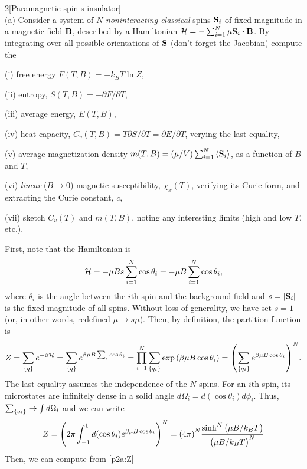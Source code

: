\documentclass[12pt]{article}
\begin{document}
\begin{problem}{2}[Paramagnetic spin-s insulator]~\\

(a) Consider a system of $N$ \textit{noninteracting classical} spins $\vb{S}_i$
of fixed magnitude in a magnetic field $\vb{B}$, described by a Hamiltonian
$\HH=-\sum_{i=1}^N\mu\vb{S}_i\vdot\vb{B}$. By integrating over all possible
orientations of $\vb{S}$ (don't forget the Jacobian) compute the

\qquad(i) free energy $F(T,B)=-k_BT\ln Z$,

\qquad(ii) entropy, $S(T,B)=-\partial F/\partial T$,

\qquad(iii) average energy, $E(T,B)$,

\qquad(iv) heat capacity, $C_v(T,B)=T\partial S/\partial T=\partial E/\partial T$,
verying the last equality,

\qquad(v) average magnetization density $m(T,B)=(\mu/V)\sum_{i=1}^N\expval{\vb{S}_i}$,
as a function of $B$ and $T$,

\qquad(vi) \textit{linear} ($B\to0$) magnetic susceptibility, $\chi_x(T)$, verifying
its Curie form, and extracting the Curie constant, $c$,

\qquad(vii) sketch $C_v(T)$ and $m(T,B)$, noting any interesting limits (high and low
$T$, etc.).

\begin{solution}
    First, note that the Hamiltonian is
\begin{equation}
    \mathcal{H}=-\mu Bs\sum_{i=1}^N\cos\theta_i
    =-\mu B\sum_{i=1}^N\cos\theta_i,
\end{equation}
where $\theta_i$ is the angle between the $i$th spin and the background field
and $s=\abs{\vb{S}_i}$ is the fixed magnitude of all spins. Without loss of
generality, we have set $s=1$ (or, in other words, redefined $\mu\to s\mu$).
Then, by definition, the partition function is
\begin{equation}
   Z=\sum_{\qty{q}}e^{-\beta\mathcal{H}}
   =\sum_\qty{q}e^{\beta\mu B\sum_i\cos\theta_i}
   =\prod_{i=1}^N\sum_{\qty{q_i}}\exp\qty(\beta\mu B\cos\theta_i)
   =\qty(\sum_\qty{q_i}e^{\beta\mu B\cos\theta_i})^N.
\end{equation}
The last equality assumes the independence of the $N$ spins. For an $i$th 
spin, its microstates are infinitely dense in a solid angle
$d\Omega_i=d(\cos\theta_i)d\phi_i$. Thus, $\sum_\qty{q_i}\to\int d\Omega_i$ and 
we can write
\begin{equation}\label{p2a:Z}
    Z=\qty(2\pi\int_{-1}^1d(\cos\theta_i)e^{\beta\mu B\cos\theta_i})^N
    =\qty(4\pi)^N\frac{\sinh^N\qty(\mu B/k_BT)}{\qty(\mu B/k_BT)^N}
\end{equation}
Then, we can compute from \eqref{p2a:Z}


\end{solution}
\end{problem}
\end{document}
